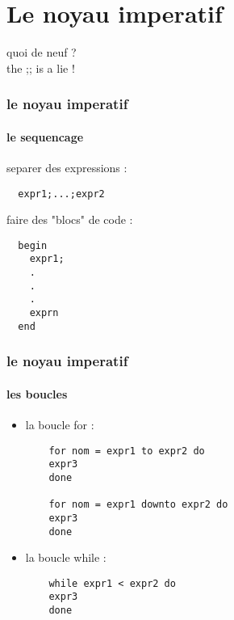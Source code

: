 \section{Le noyau imperatif}

\begin{frame}
quoi de neuf ? \\
the ;; is a lie !
\end{frame}


\begin{frame}[fragile]
  \frametitle{le noyau imperatif}
  \framesubtitle{le sequencage}
  separer des expressions :
  \begin{lstlisting}
  expr1;...;expr2
  \end{lstlisting}
  faire des "blocs" de code :
  \begin{lstlisting}
  begin
    expr1; 
    .
    .
    .
    exprn
  end
  \end{lstlisting}
\end{frame}

\begin{frame}[fragile]
    \frametitle{le noyau imperatif}
    \framesubtitle{les boucles}
    \begin{itemize}
      \item
	la boucle for :
	\begin{lstlisting}
	for nom = expr1 to expr2 do 
	expr3
	done

	for nom = expr1 downto expr2 do
	expr3
	done
	\end{lstlisting}
      \item
	la boucle while :
	\begin{lstlisting}
	while expr1 < expr2 do
	expr3
	done
      \end{lstlisting}
  \end{itemize}
\end{frame}
